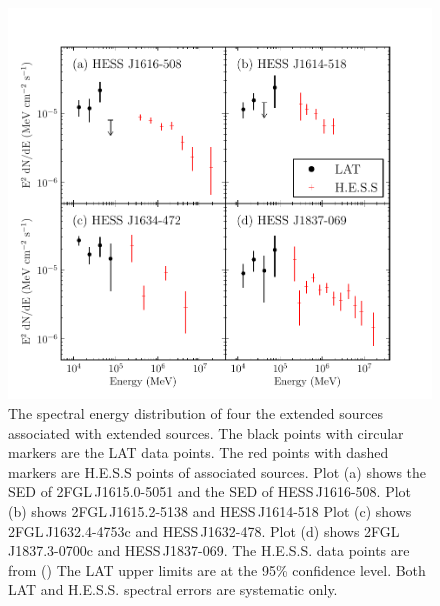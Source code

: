 \documentclass[12pt,preprint]{aastex}
\newcommand{\gev}{\text{GeV}\xspace}
\newcommand{\tev}{\text{TeV}\xspace}
\begin{document}
\clearpage
\begin{figure}
  \begin{center}
    \includegraphics{summary_plots/hess_seds.pdf}
    \end{center}
    \caption{
    The spectral energy distribution of four the extended sources
    associated with extended \tev sources.  The black points with circular
    markers are the LAT data points. The red points with dashed markers
    are H.E.S.S points of associated sources.  Plot (a) shows the \gev
    SED of 2FGL\,J1615.0-5051 and the \tev SED of HESS\,J1616-508.
    Plot (b) shows 2FGL\,J1615.2-5138 and HESS\,J1614-518 Plot (c)
    shows 2FGL\,J1632.4-4753c and HESS\,J1632-478. Plot (d) shows
    2FGL\,J1837.3-0700c and HESS\,J1837-069. The H.E.S.S. data points
    are from (\cite{hess_plane_survey}) The LAT upper limits are at the
    95\% confidence level.  Both LAT and H.E.S.S. spectral errors are
    systematic only.
    }\label{hess_seds}
  \end{figure}
\end{document}
